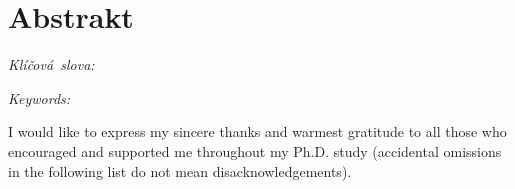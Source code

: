 %
%
\chapter*{Abstrakt}
\abstractCS

\vspace{2em}
\noindent \emph{Klíčová~slova:} \keywordsCS


\cleardoublepageempty
{}
\abstract

\vspace{2em}
\begin{sloppypar}
\noindent \emph{Keywords:} \keywords
\end{sloppypar}





%
%
\cleardoublepageempty
{}

I would like to express my sincere thanks and warmest gratitude to all those who encouraged and supported me throughout my Ph.D. study (accidental omissions in the following list do not mean disacknowledgements).

